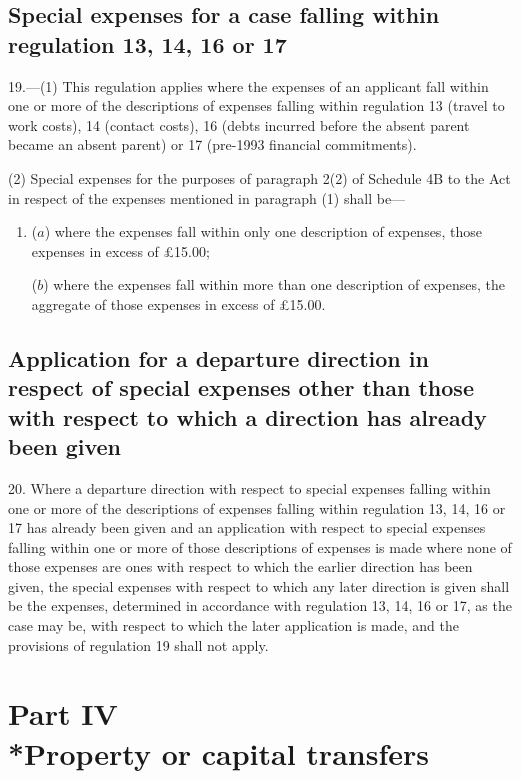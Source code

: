 \documentclass[a4paper]{article}
\begin{document}
\subsection[19. Special expenses for a case falling within regulation 13, 14, 16 or 17]{Special expenses for a case falling within regulation 13, 14, 16 or 17}

19.—(1)
This regulation applies where the expenses of an applicant fall within one or
more of the descriptions of expenses falling within regulation 13 (travel to
work costs), 14 (contact costs), 16 (debts incurred before the absent parent
became an absent parent) or 17 (pre-1993 financial commitments).

(2) Special expenses for the purposes of paragraph 2(2) of Schedule 4B to the
Act in respect of the expenses mentioned in paragraph (1) shall be—
\begin{enumerate}\item[]
($a$) where the expenses fall within only one description of expenses, those
expenses in excess of £15.00;

($b$) where the expenses fall within more than one description of expenses, the
aggregate of those expenses in excess of £15.00.
\end{enumerate}

\subsection[20. Application for a departure direction in respect of special expenses other than
those with respect to which a direction has already been given]{Application for a departure direction in respect of special expenses other than
those with respect to which a direction has already been given}

20. Where a
departure direction with respect to special expenses falling within one or more
of the descriptions of expenses falling within regulation 13, 14, 16 or 17 has
already been given and an application with respect to special expenses falling
within one or more of those descriptions of expenses is made where none of those
expenses are ones with respect to which the earlier direction has been given,
the special expenses with respect to which any later direction is given shall be
the expenses, determined in accordance with regulation 13, 14, 16 or 17, as the
case may be, with respect to which the later application is made, and the
provisions of regulation 19 shall not apply.

\section[Part IV --- Property or capital transfers]{Part IV\\*Property or capital transfers}
\end{document}
